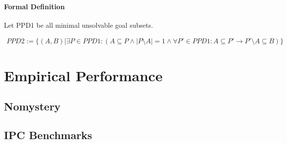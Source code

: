 \documentclass[12pt]{article}
\begin{document}
\paragraph{Formal Definition}
Let PPD1 be all minimal unsolvable goal subsets.

\begin{align*}
	PPD2 := \{(A,B) | 
		\exists P \in PPD1:(
			A \subseteq P \wedge |P \setminus A | = 1 \wedge
			\forall P' \in PPD1:
				A \subseteq P' \rightarrow P' \setminus A \subseteq B
		)
	\}
\end{align*}

\newpage
\section{Empirical Performance}

	\subsection{Nomystery}
		

		\newpage
	\subsection{IPC Benchmarks}
		
\end{document}
